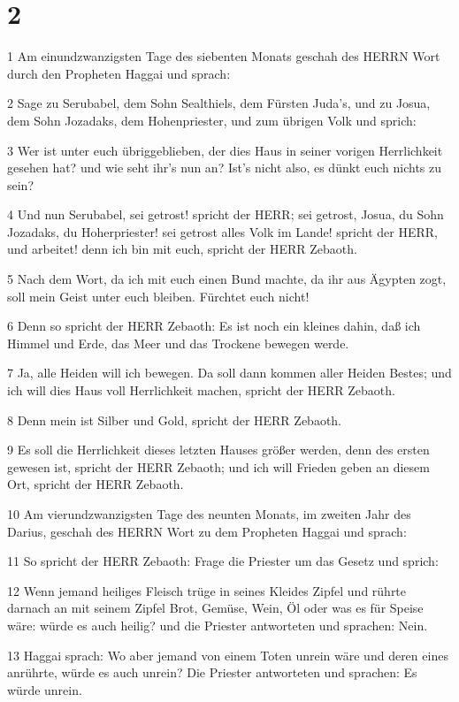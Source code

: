 \chapter{2}

\par 1 Am einundzwanzigsten Tage des siebenten Monats geschah des HERRN Wort durch den Propheten Haggai und sprach:
\par 2 Sage zu Serubabel, dem Sohn Sealthiels, dem Fürsten Juda's, und zu Josua, dem Sohn Jozadaks, dem Hohenpriester, und zum übrigen Volk und sprich:
\par 3 Wer ist unter euch übriggeblieben, der dies Haus in seiner vorigen Herrlichkeit gesehen hat? und wie seht ihr's nun an? Ist's nicht also, es dünkt euch nichts zu sein?
\par 4 Und nun Serubabel, sei getrost! spricht der HERR; sei getrost, Josua, du Sohn Jozadaks, du Hoherpriester! sei getrost alles Volk im Lande! spricht der HERR, und arbeitet! denn ich bin mit euch, spricht der HERR Zebaoth.
\par 5 Nach dem Wort, da ich mit euch einen Bund machte, da ihr aus Ägypten zogt, soll mein Geist unter euch bleiben. Fürchtet euch nicht!
\par 6 Denn so spricht der HERR Zebaoth: Es ist noch ein kleines dahin, daß ich Himmel und Erde, das Meer und das Trockene bewegen werde.
\par 7 Ja, alle Heiden will ich bewegen. Da soll dann kommen aller Heiden Bestes; und ich will dies Haus voll Herrlichkeit machen, spricht der HERR Zebaoth.
\par 8 Denn mein ist Silber und Gold, spricht der HERR Zebaoth.
\par 9 Es soll die Herrlichkeit dieses letzten Hauses größer werden, denn des ersten gewesen ist, spricht der HERR Zebaoth; und ich will Frieden geben an diesem Ort, spricht der HERR Zebaoth.
\par 10 Am vierundzwanzigsten Tage des neunten Monats, im zweiten Jahr des Darius, geschah des HERRN Wort zu dem Propheten Haggai und sprach:
\par 11 So spricht der HERR Zebaoth: Frage die Priester um das Gesetz und sprich:
\par 12 Wenn jemand heiliges Fleisch trüge in seines Kleides Zipfel und rührte darnach an mit seinem Zipfel Brot, Gemüse, Wein, Öl oder was es für Speise wäre: würde es auch heilig? und die Priester antworteten und sprachen: Nein.
\par 13 Haggai sprach: Wo aber jemand von einem Toten unrein wäre und deren eines anrührte, würde es auch unrein? Die Priester antworteten und sprachen: Es würde unrein.
